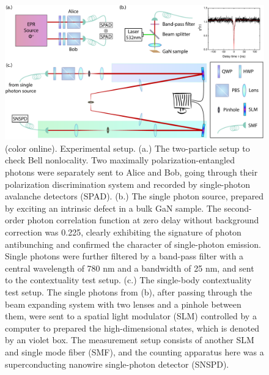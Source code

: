 \documentclass[prl,letterpaper,english,reprint,nofootinbib,aps,superscriptaddress,showpacs,showkeys]{revtex4-1}
\theoremstyle{definition}
\theoremstyle{remark}
\begin{document}
\begin{figure}[t]
    \centering
    \includegraphics[width=160mm]{fig/exp-sch-draft-v2.pdf}
    \caption{(color online). Experimental setup.
    (a.) The two-particle setup to check Bell nonlocality. Two maximally polarization-entangled photons were separately sent to Alice and Bob, going through their polarization discrimination system and recorded by single-photon avalanche detectors (SPAD).
    (b.) The single photon source, prepared by exciting an intrinsic defect in a bulk GaN sample. The second-order photon correlation function at zero delay without background correction was 0.225, clearly exhibiting the signature of photon antibunching and confirmed the character of single-photon emission. Single photons were further filtered by a band-pass filter with a central wavelength of 780 nm and a bandwidth of 25 nm, and sent to the contextuality test setup.
    (c.) The single-body contextuality test setup.
    The single photons from (b), after passing through the beam expanding system with two lenses and a pinhole between them, were sent to a spatial light modulator (SLM) controlled by a computer to prepared the high-dimensional states, which is denoted by an violet box. The measurement setup consists of another SLM and single mode fiber (SMF), and the counting apparatus here was a superconducting nanowire single-photon detector (SNSPD).}
    \label{fig:exp-sch}
 \end{figure}

\end{document}
